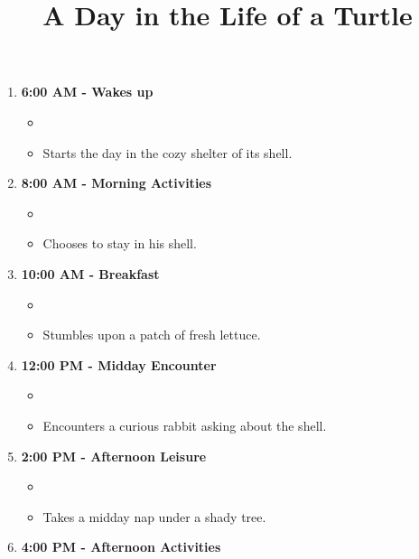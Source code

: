 \documentclass{article}
\title{A Day in the Life of a Turtle}
\date{}
\begin{document}
\maketitle

\begin{enumerate}
\item \textbf{6:00 AM - Wakes up}
\begin{itemize}
\item %
\item Starts the day in the cozy shelter of its shell.
\end{itemize}
\item \textbf{8:00 AM - Morning Activities}
\begin{itemize}
\item %
\item Chooses to stay in his shell.
\end{itemize}
\item \textbf{10:00 AM - Breakfast}
\begin{itemize}
\item %
\item Stumbles upon a patch of fresh lettuce.
\end{itemize}
\item \textbf{12:00 PM - Midday Encounter}
\begin{itemize}
\item %
\item Encounters a curious rabbit asking about the shell.
\end{itemize}
\item \textbf{2:00 PM - Afternoon Leisure}
\begin{itemize}
\item %
\item Takes a midday nap under a shady tree.
\end{itemize}
\item \textbf{4:00 PM - Afternoon Activities}

\end{enumerate}
\end{document}
